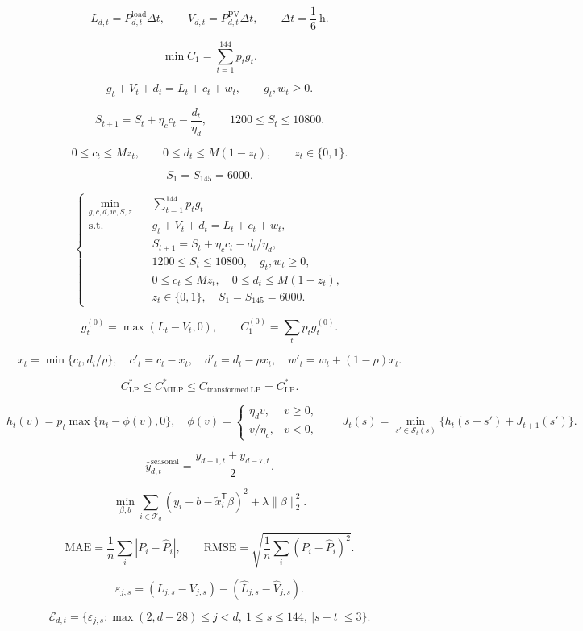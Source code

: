 \[
L_{d,t}=P^{\mathrm{load}}_{d,t}\Delta t,\qquad V_{d,t}=P^{\mathrm{PV}}_{d,t}\Delta t,\qquad \Delta t=\frac{1}{6}\ \mathrm{h}.
\]

\[
\min C_1=\sum_{t=1}^{144}p_tg_t.
\]

\[
g_t+V_t+d_t=L_t+c_t+w_t,\qquad g_t,w_t\geq0.
\]

\[
S_{t+1}=S_t+\eta_c c_t-\frac{d_t}{\eta_d},\qquad 1200\leq S_t\leq10800.
\]

\[
0\leq c_t\leq Mz_t,\qquad 0\leq d_t\leq M(1-z_t),\qquad z_t\in\{0,1\}.
\]

\[
S_1=S_{145}=6000.
\]

\[
\boxed{\left\{\begin{aligned}\min_{g,c,d,w,S,z}\quad &\sum_{t=1}^{144}p_tg_t\\\mathrm{s.t.}\quad &g_t+V_t+d_t=L_t+c_t+w_t,\\&S_{t+1}=S_t+\eta_c c_t-d_t/\eta_d,\\&1200\leq S_t\leq10800,\quad g_t,w_t\geq0,\\&0\leq c_t\leq Mz_t,\quad0\leq d_t\leq M(1-z_t),\\&z_t\in\{0,1\},\quad S_1=S_{145}=6000.\end{aligned}\right.}
\]

\[
g_t^{(0)}=\max(L_t-V_t,0),\qquad C_1^{(0)}=\sum_t p_tg_t^{(0)}.
\]

\[
x_t=\min\{c_t,d_t/\rho\},\quad c'_t=c_t-x_t,\quad d'_t=d_t-\rho x_t,\quad w'_t=w_t+(1-\rho)x_t.
\]

\[
C_{\mathrm{LP}}^{*}\le C_{\mathrm{MILP}}^{*}\le C_{\mathrm{transformed\ LP}}=C_{\mathrm{LP}}^{*}.
\]

\[
h_t(v)=p_t\max\{n_t-\phi(v),0\},\quad \phi(v)=\begin{cases}\eta_dv,&v\geq0,\\v/\eta_c,&v<0,\end{cases}\qquad J_t(s)=\min_{s'\in\mathcal S_t(s)}\{h_t(s-s')+J_{t+1}(s')\}.
\]

\[
\hat y_{d,t}^{\mathrm{seasonal}}=\frac{y_{d-1,t}+y_{d-7,t}}{2}.
\]

\[
\min_{\beta,b}\sum_{i\in\mathcal T_d}(y_i-b-\widetilde{x}_i^{\mathsf T}\beta)^2+\lambda\|\beta\|_2^2.
\]

\[
\mathrm{MAE}=\frac{1}{n}\sum_i|P_i-\widehat P_i|,\qquad\mathrm{RMSE}=\sqrt{\frac{1}{n}\sum_i(P_i-\widehat P_i)^2}.
\]

\[
\varepsilon_{j,s}=(L_{j,s}-V_{j,s})-(\hat L_{j,s}-\hat V_{j,s}).
\]

\[
\mathcal E_{d,t}=\{\varepsilon_{j,s}:\max(2,d-28)\leq j<d,\ 1\leq s\leq144,\ |s-t|\leq3\}.
\]

